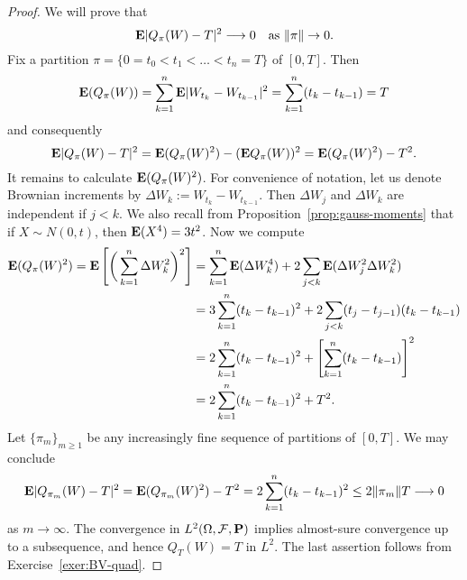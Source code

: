 \begin{proof}
We will prove that
\begin{equation*}
    \mathbf{E} |Q_\pi(W) - T|^2 \longrightarrow 0 \quad \text{as } \|\pi\| \to 0.
\end{equation*}
Fix a partition $\pi = \{0 = t_0 < t_1 < \ldots < t_n = T\}$ of $[0, T]$. Then
\begin{equation*}
    \mathbf{E}(Q_\pi(W)) = \sum_{k=1}^n \mathbf{E} |W_{t_k} - W_{t_{k-1}}|^2 = \sum_{k=1}^n (t_k - t_{k-1}) = T
\end{equation*}
and consequently
\begin{equation*}
    \mathbf{E} |Q_\pi(W) - T|^2 = \mathbf{E}(Q_\pi(W)^2) - (\mathbf{E} Q_\pi(W))^2 = \mathbf{E}(Q_\pi(W)^2) - T^2.
\end{equation*}
It remains to calculate $\mathbf{E}(Q_\pi(W)^2)$. For convenience of notation, let us denote Brownian increments by $\Delta W_k := W_{t_k} - W_{t_{k-1}}$. Then $\Delta W_j$ and $\Delta W_k$ are independent if $j < k$. We also recall from Proposition~\ref{prop:gauss-moments} that if $X \sim N(0, t)$, then $\mathbf{E}(X^4) = 3t^2$. Now we compute
\begin{align*}
    \mathbf{E}(Q_\pi(W)^2) = \mathbf{E} \left[ \bigg( \sum_{k=1}^n \Delta W_k^2 \bigg)^2 \right] &= \sum_{k=1}^n \mathbf{E}(\Delta W_k^4) + 2 \sum_{j < k} \mathbf{E}(\Delta W_j^2 \Delta W_k^2) \\
    &= 3 \sum_{k=1}^n (t_k - t_{k-1})^2 + 2 \sum_{j<k} (t_j - t_{j-1})(t_k - t_{k-1}) \\
    &= 2 \sum_{k=1}^n (t_k - t_{k-1})^2 + \left[ \sum_{k=1}^n (t_k - t_{k-1}) \right]^2 \\
    &= 2 \sum_{k=1}^n (t_k - t_{k-1})^2 + T^2.
\end{align*}
Let $\{\pi_m\}_{m\ge 1}$ be any increasingly fine sequence of partitions of $[0,T]$. We may conclude
\begin{equation*}
    \mathbf{E} |Q_{\pi_m}(W) - T|^2 = \mathbf{E}(Q_{\pi_m}(W)^2) - T^2 = 2 \sum_{k=1}^n (t_k - t_{k-1})^2 \le 2 \|\pi_m\| T \longrightarrow 0
\end{equation*}
as $m\to\infty$. The convergence in $L^2(\Omega,\mathcal{F},\mathbf{P})$ implies almost-sure convergence up to a subsequence, and hence $Q_T(W)=T$ in $L^2$. The last assertion follows from Exercise~\ref{exer:BV-quad}.
\end{proof}

